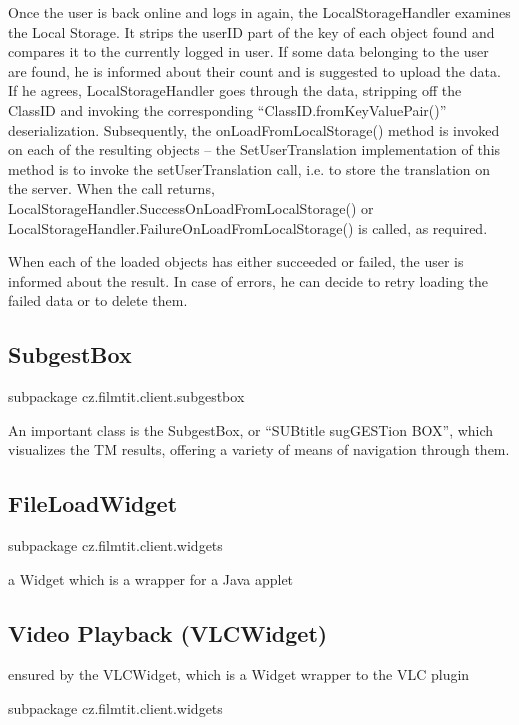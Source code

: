 Once the user is back online and logs in again, the LocalStorageHandler examines the Local Storage. It strips the userID part of the key of each object found and compares it to the currently logged in user. If some data belonging to the user are found, he is informed about their count and is suggested to upload the data. If he agrees, LocalStorageHandler goes through the data, stripping off the ClassID and invoking the corresponding ``ClassID.fromKeyValuePair()'' deserialization. Subsequently, the onLoadFromLocalStorage() method is invoked on each of the resulting objects -- the SetUserTranslation implementation of this method is to invoke the setUserTranslation call, i.e. to store the translation on the server. When the call returns, LocalStorageHandler.SuccessOnLoadFromLocalStorage() or LocalStorageHandler.FailureOnLoadFromLocalStorage() is called, as required.

When each of the loaded objects has either succeeded or failed, the user is informed about the result. In case of errors, he can decide to retry loading the failed data or to delete them.

\subsection{SubgestBox}

subpackage cz.filmtit.client.subgestbox

An important class is the SubgestBox, or ``SUBtitle sugGESTion BOX'', which visualizes the TM results, offering a variety of means of navigation through them.

\subsection{FileLoadWidget}

subpackage cz.filmtit.client.widgets

a Widget which is a wrapper for a Java applet


\subsection{Video Playback (VLCWidget)}

ensured by the VLCWidget, which is a Widget wrapper to the VLC plugin

subpackage cz.filmtit.client.widgets


